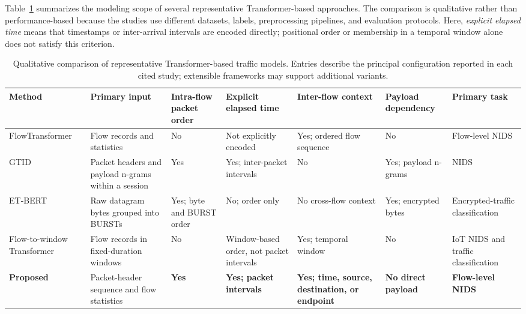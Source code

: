 \documentclass[11pt,fleqn]{report}
\begin{document}
Table~\ref{tab:rw_model_comparison} summarizes the modeling scope of several representative Transformer-based approaches. The comparison is qualitative rather than performance-based because the studies use different datasets, labels, preprocessing pipelines, and evaluation protocols. Here, \emph{explicit elapsed time} means that timestamps or inter-arrival intervals are encoded directly; positional order or membership in a temporal window alone does not satisfy this criterion.

\begin{table}[tbp]
\centering
\caption{Qualitative comparison of representative Transformer-based traffic models. Entries describe the principal configuration reported in each cited study; extensible frameworks may support additional variants.}
\label{tab:rw_model_comparison}
\scriptsize
\setlength{\tabcolsep}{2pt}
\renewcommand{\arraystretch}{1.22}
\begin{tabular}{@{}p{1.85cm}p{2.65cm}p{1.55cm}p{2.15cm}p{2.45cm}p{1.85cm}p{1.85cm}@{}}
\toprule
\textbf{Method} &
\textbf{Primary input} &
\textbf{Intra-flow packet order} &
\textbf{Explicit elapsed time} &
\textbf{Inter-flow context} &
\textbf{Payload dependency} &
\textbf{Primary task} \\
\midrule
FlowTransformer \cite{Manocchio2024FlowTransformer} &
Flow records and statistics &
No &
Not explicitly encoded &
Yes; ordered flow sequence &
No &
Flow-level NIDS \\

GTID \cite{Han2023GTID} &
Packet headers and payload n-grams within a session &
Yes &
Yes; inter-packet intervals &
No &
Yes; payload n-grams &
NIDS \\

ET-BERT \cite{Lin2022ETBERT} &
Raw datagram bytes grouped into BURSTs &
Yes; byte and BURST order &
No; order only &
No cross-flow context &
Yes; encrypted bytes &
Encrypted-traffic classification \\

Flow-to-window Transformer \cite{MartinReizabal2026FlowWindow} &
Flow records in fixed-duration windows &
No &
Window-based order, not packet intervals &
Yes; temporal window &
No &
IoT NIDS and traffic classification \\

\textbf{Proposed} &
Packet-header sequence and flow statistics &
\textbf{Yes} &
\textbf{Yes; packet intervals} &
\textbf{Yes; time, source, destination, or endpoint} &
\textbf{No direct payload} &
\textbf{Flow-level NIDS} \\
\bottomrule
\end{tabular}
\end{table}
\end{document}
